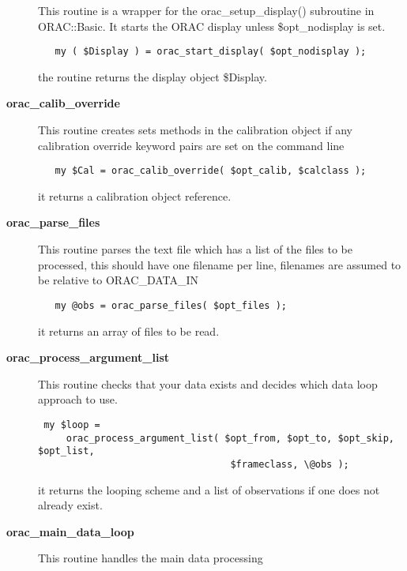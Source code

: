 \begin{description}
This routine is a wrapper for the orac\_setup\_display() subroutine in 
ORAC::Basic. It starts the ORAC display unless \$opt\_nodisplay is
set.

\begin{verbatim}
   my ( $Display ) = orac_start_display( $opt_nodisplay );
\end{verbatim}


the routine returns the display object \$Display.

\item[\textbf{orac\_calib\_override}] \mbox{}

This routine creates sets methods in the calibration object if any
calibration override keyword pairs are set on the command line

\begin{verbatim}
   my $Cal = orac_calib_override( $opt_calib, $calclass );
\end{verbatim}


it returns a calibration object reference.

\item[\textbf{orac\_parse\_files}] \mbox{}

This routine parses the text file which has a list of the files to be
processed, this should have one filename per line, filenames are
assumed to be relative to ORAC\_DATA\_IN

\begin{verbatim}
   my @obs = orac_parse_files( $opt_files );
\end{verbatim}


it returns an array of files to be read.

\item[\textbf{orac\_process\_argument\_list}] \mbox{}

This routine checks that your data exists and decides which data 
loop approach to use.

\begin{verbatim}
 my $loop =  
     orac_process_argument_list( $opt_from, $opt_to, $opt_skip, $opt_list,
                                  $frameclass, \@obs );
\end{verbatim}


it returns the looping scheme and a list of observations if one does not
already exist.

\item[\textbf{orac\_main\_data\_loop}] \mbox{}

This routine handles the main data processing


\end{description}
